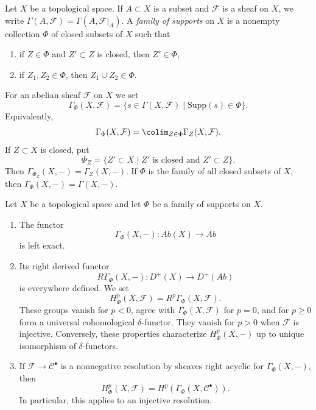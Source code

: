 \begin{definition}
\label{definition-family-supports}
\begin{reference}
\cite[Chapter III, \S 3.2, pp. 156--157]{Tohoku}
\end{reference}
Let $X$ be a topological space. If $A \subset X$ is a subset and
$\mathcal{F}$ is a sheaf on $X$, we write
$\Gamma(A, \mathcal{F}) = \Gamma(A, \mathcal{F}|_A)$.
A {\it family of supports} on $X$ is a nonempty collection $\Phi$ of
closed subsets of $X$ such that
\begin{enumerate}
\item if $Z \in \Phi$ and $Z' \subset Z$ is closed, then $Z' \in \Phi$,
\item if $Z_1, Z_2 \in \Phi$, then $Z_1 \cup Z_2 \in \Phi$.
\end{enumerate}
For an abelian sheaf $\mathcal{F}$ on $X$ we set
$$
\Gamma_\Phi(X, \mathcal{F}) =
\{s \in \Gamma(X, \mathcal{F}) \mid \text{Supp}(s) \in \Phi\}.
$$
Equivalently,
$$
\Gamma_\Phi(X, \mathcal{F}) =
\colim_{Z \in \Phi} \Gamma_Z(X, \mathcal{F}).
$$
If $Z \subset X$ is closed, put
$$
\Phi_Z = \{Z' \subset X \mid Z' \text{ is closed and } Z' \subset Z\}.
$$
Then $\Gamma_{\Phi_Z}(X, -) = \Gamma_Z(X, -)$. If $\Phi$ is the family of all
closed subsets of $X$, then
$\Gamma_\Phi(X, -) = \Gamma(X, -)$.
\end{definition}

\begin{lemma}
\label{lemma-cohomology-family-supports}
\begin{reference}
\cite[Chapter III, \S 3.2, Proposition 3.2.1, p. 157]{Tohoku}
\end{reference}
Let $X$ be a topological space and let $\Phi$ be a family of supports on
$X$.
\begin{enumerate}
\item The functor
$$
\Gamma_\Phi(X, -) : \textit{Ab}(X) \longrightarrow \textit{Ab}
$$
is left exact.
\item Its right derived functor
$$
R\Gamma_\Phi(X, -) : D^+(X) \longrightarrow D^+(\textit{Ab})
$$
is everywhere defined. We set
$$
H^p_\Phi(X, \mathcal{F}) = R^p\Gamma_\Phi(X, \mathcal{F}).
$$
These groups vanish for $p < 0$, agree with
$\Gamma_\Phi(X, \mathcal{F})$ for $p = 0$, and for $p \geq 0$ form a
universal cohomological $\delta$-functor. They vanish for $p > 0$ when
$\mathcal{F}$ is injective. Conversely, these properties characterize
$H^p_\Phi(X, -)$ up to unique isomorphism of $\delta$-functors.
\item If $\mathcal{F} \to \mathcal{C}^\bullet$ is a nonnegative
resolution by sheaves right acyclic for $\Gamma_\Phi(X, -)$, then
$$
H^p_\Phi(X, \mathcal{F}) =
H^p(\Gamma_\Phi(X, \mathcal{C}^\bullet)).
$$
In particular, this applies to an injective resolution.
\end{enumerate}
\end{lemma}

